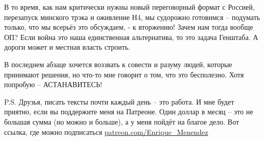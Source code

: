 В то время, как нам критически нужны новый переговорный формат с Россией,
перезапуск минского трэка и оживление Н4, мы судорожно готовимся – подумать
только, что мы всерьёз это обсуждаем, - к вторжению! Зачем нам тогда вообще ОП?
Если война это наша единственная альтернатива, то это задача Генштаба. А дороги
может и местная власть строить.

В последнем абзаце хочется воззвать к совести и разуму людей, которые принимают
решения, но что-то мне говорит о том, что это бесполезно. Хотя попробую –
АСТАНАВИТЕСЬ!

P.S. Друзья, писать тексты почти каждый день – это работа. И мне будет приятно,
если вы поддержите меня на Патреоне. Один доллар в месяц – это не большая сумма
(но можно и больше), а у меня пойдёт на благое дело. Вот ссылка, где можно
подписаться \url{patreon.com/Enrique_Menendez}

